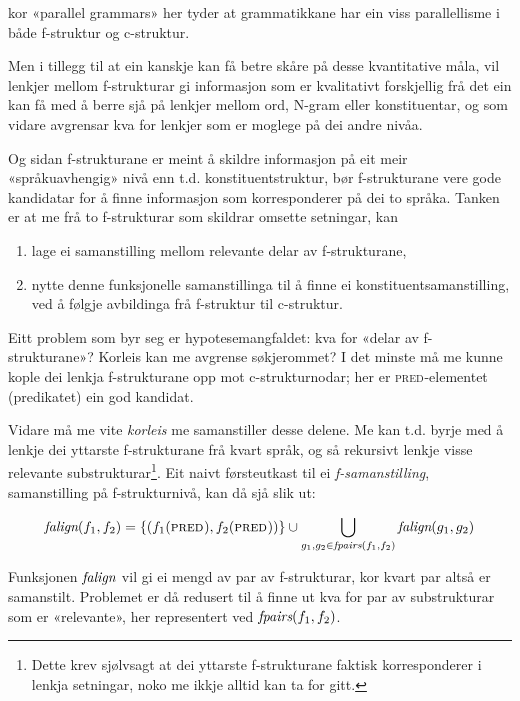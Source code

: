 \documentclass[12pt,a4paper,oneside,draft]{report}
\newcommand{\F}[2]{\textsc{#1}\ensuremath{_{#2}}}
\newcommand{\PRED}{\F{pred}{}}
\newcommand{\falign}{\ensuremath{\operatorname{\emph{falign}}}}
\newcommand{\fpairs}{\ensuremath{\operatorname{\emph{fpairs}}}}
\begin{document}
kor «parallel grammars» her tyder at grammatikkane har ein viss
 parallellisme i både f\hyp{}struktur og c\hyp{}struktur.

Men i tillegg til at ein kanskje kan få betre skåre på desse
 kvantitative måla, vil lenkjer mellom f\hyp{}strukturar gi
 informasjon som er kvalitativt forskjellig frå det ein kan få med å
 berre sjå på lenkjer mellom ord, N-gram eller konstituentar, og som
 vidare avgrensar kva for lenkjer som er moglege på dei andre nivåa.


Og sidan f\hyp{}strukturane er meint å skildre informasjon på eit meir
 «språkuavhengig» nivå enn t.d. konstituentstruktur, bør f\hyp{}strukturane
 vere gode kandidatar for å finne informasjon som korresponderer på
 dei to språka. Tanken er at me frå to f\hyp{}strukturar som skildrar
 omsette setningar, kan
\begin{enumerate}
\item lage ei samanstilling mellom relevante delar av f\hyp{}strukturane,
\item nytte denne funksjonelle samanstillinga til å finne ei
   konstituentsamanstilling, ved å følgje avbildinga frå
   f\hyp{}struktur til c\hyp{}struktur.
\end{enumerate}
Eitt problem som byr seg er hypotesemangfaldet: kva for «delar av
 f\hyp{}strukturane»? Korleis kan me avgrense søkjerommet? I det minste må
 me kunne kople dei lenkja f\hyp{}strukturane opp mot c\hyp{}strukturnodar; her
 er \PRED{}-elementet (predikatet) ein god kandidat.

Vidare må me vite \emph{korleis} me samanstiller desse delene. Me kan
 t.d. byrje med å lenkje dei yttarste f\hyp{}strukturane frå kvart språk,
 og så rekursivt lenkje visse relevante substrukturar\footnote{Dette krev sjølvsagt at dei yttarste f\hyp{}strukturane faktisk
        korresponderer i lenkja setningar, noko me ikkje alltid kan ta
        for gitt. }.  Eit
 naivt førsteutkast til ei \emph{f-samanstilling}, samanstilling på
 f\hyp{}strukturnivå, kan då sjå slik ut:


\[
\falign(f_{1}, f_{2}) =
\{ (f_{1}(\PRED), f_{2}(\PRED)) \}
\cup
\bigcup_{g_{1},g_{2}\in \fpairs(f_{1},f_{2})} \falign(g_{1}, g_{2})
\]

Funksjonen \falign{} vil gi ei mengd av par av f\hyp{}strukturar, kor
 kvart par altså er samanstilt. Problemet er då redusert til å finne
 ut kva for par av substrukturar som er «relevante», her representert
 ved $\fpairs(f_{1},f_{2})$.
\end{document}
